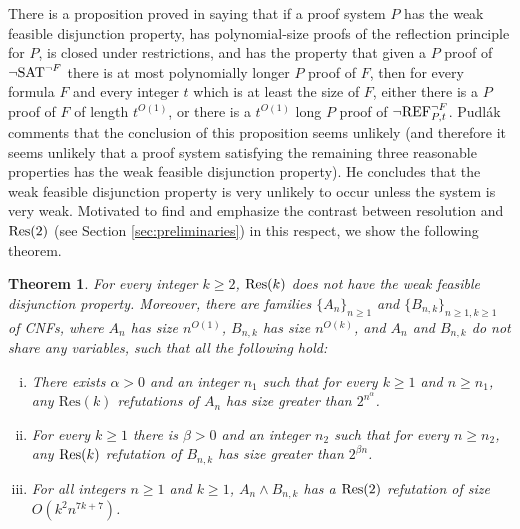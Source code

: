 \documentclass[10pt,a4paper]{article}
\newtheorem{theorem}{Theorem}
\theoremstyle{remark}
\newtheorem*{switching lemma}{Switching Lemma}
\newtheorem*{open problem}{Open Problem}
\theoremstyle{definition}
\begin{document}
There is a proposition proved in \cite{Pudlak2003} saying that if a proof system $P$ has the weak feasible disjunction property, has polynomial-size proofs of the reflection principle for $P$, is closed under restrictions, and has the property that given a $P$ proof of $\neg \textnormal{SAT}^{\neg F}$ there is at most polynomially longer $P$ proof of $F$, then for every formula $F$ and every integer $t$ which is at least the size of $F$, either there is a $P$ proof of $F$ of length $t^{O(1)}$, or there is a $t^{O(1)}$ long $P$ proof of $\neg \textnormal{REF}^{\neg F}_{P,t}$. Pudl\'ak comments that the conclusion of this proposition seems unlikely (and therefore it seems unlikely that a proof system satisfying the remaining three reasonable properties has the weak feasible disjunction property). He concludes that the weak feasible disjunction property is very unlikely to occur unless the system is very weak. Motivated to find and emphasize the contrast between resolution and $\textnormal{Res}(2)$ (see Section \ref{sec:preliminaries}) in this respect, we show the following theorem.

\begin{theorem}
\label{thm:res(k)-no-wfdp}
For every integer $k \geq 2$, $\textnormal{Res}(k)$ does not have the weak feasible disjunction property. Moreover, there are families $\{A_n\}_{n \geq 1}$ and $\{B_{n,k}\}_{n \geq 1, k \geq 1}$ of CNFs, where $A_n$ has size $n^{O(1)}$, $B_{n,k}$ has size $n^{O(k)}$, and $A_n$ and  $B_{n,k}$ do not share any variables, such that all the following hold:
\begin{enumerate}[(i)]
\item \label{item:lower_bound_on_A_n} There exists $\alpha > 0$ and an integer $n_1$ such that for every $k \geq 1$ and $n \geq n_1$, any $\text{Res}(k)$ refutations of $A_n$ has size greater than $2^{n^{\alpha}}$.
\item \label{item:lower_bound_on_B_n} For every $k \geq 1$ there is $\beta > 0$ and an integer $n_2$ such that for every $n \geq n_2$, any $\textnormal{Res}(k)$ refutation of $B_{n,k}$ has size greater than $2^{\beta n}$. 
\item \label{item:upper_bound_on_A_n_and_B_n} For all integers $n \geq 1$ and $k \geq 1$, $A_n \land B_{n,k}$ has a $\textnormal{Res}(2)$ refutation of size $O(k^2 n^{7k+7})$.
\end{enumerate}
\end{theorem}
\end{document}
